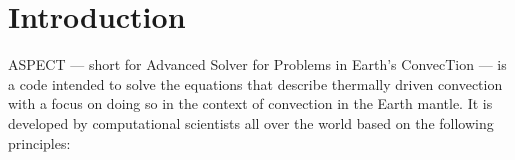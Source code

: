 \documentclass{article}
\newcommand{\aspect}{\textsc{ASPECT}}
\begin{document}
\pagebreak
{}


\pagebreak

\tableofcontents

\pagebreak

\section{Introduction}

\aspect{} --- short for Advanced Solver for Problems in Earth's ConvecTion ---
is a code intended to solve the equations that describe thermally driven
convection with a focus on doing so in the context of convection in the Earth
mantle. It is developed by computational scientists all over the world
based on the following principles:
\end{document}
